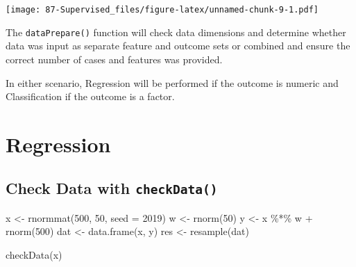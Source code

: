 \documentclass[
]{book}
\newenvironment{Shaded}{\begin{snugshade}}{\end{snugshade}}
\newcommand{\AttributeTok}[1]{\textcolor[rgb]{0.77,0.63,0.00}{#1}}
\newcommand{\DecValTok}[1]{\textcolor[rgb]{0.00,0.00,0.81}{#1}}
\newcommand{\FunctionTok}[1]{\textcolor[rgb]{0.00,0.00,0.00}{#1}}
\newcommand{\NormalTok}[1]{#1}
\newcommand{\OtherTok}[1]{\textcolor[rgb]{0.56,0.35,0.01}{#1}}
\newcommand{\SpecialCharTok}[1]{\textcolor[rgb]{0.00,0.00,0.00}{#1}}
\begin{document}
\texttt{[image: 87-Supervised\_files/figure-latex/unnamed-chunk-9-1.pdf]}

The \texttt{dataPrepare()} function will check data dimensions and determine whether data was input as separate feature and outcome sets or combined and ensure the correct number of cases and features was provided.

In either scenario, Regression will be performed if the outcome is numeric and Classification if the outcome is a factor.

\hypertarget{regression}{%
\section{Regression}\label{regression}}

\hypertarget{check-data-with-checkdata}{%
\subsection{\texorpdfstring{Check Data with \texttt{checkData()}}{Check Data with checkData()}}\label{check-data-with-checkdata}}

\begin{Shaded}
\begin{Highlighting}[]
\NormalTok{x }\OtherTok{\textless{}{-}} \FunctionTok{rnormmat}\NormalTok{(}\DecValTok{500}\NormalTok{, }\DecValTok{50}\NormalTok{, }\AttributeTok{seed =} \DecValTok{2019}\NormalTok{)}
\NormalTok{w }\OtherTok{\textless{}{-}} \FunctionTok{rnorm}\NormalTok{(}\DecValTok{50}\NormalTok{)}
\NormalTok{y }\OtherTok{\textless{}{-}}\NormalTok{ x }\SpecialCharTok{\%*\%}\NormalTok{ w }\SpecialCharTok{+} \FunctionTok{rnorm}\NormalTok{(}\DecValTok{500}\NormalTok{)}
\NormalTok{dat }\OtherTok{\textless{}{-}} \FunctionTok{data.frame}\NormalTok{(x, y)}
\NormalTok{res }\OtherTok{\textless{}{-}} \FunctionTok{resample}\NormalTok{(dat)}
\end{Highlighting}
\end{Shaded}

\begin{Shaded}
\end{Shaded}

\begin{Shaded}
\begin{Highlighting}[]
\FunctionTok{checkData}\NormalTok{(x)}
\end{Highlighting}
\end{Shaded}
\end{document}

